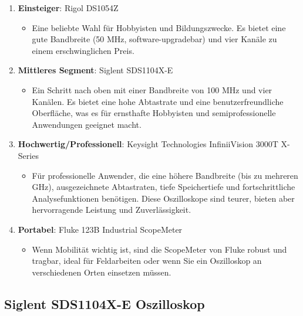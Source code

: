 \documentclass{vorlage-design-main}
\begin{document}
\begin{enumerate}
\def\labelenumi{\arabic{enumi}.}

\item
  \textbf{Einsteiger}: Rigol DS1054Z

  \begin{itemize}
  
  \item
    Eine beliebte Wahl für Hobbyisten und Bildungszwecke. Es bietet eine
    gute Bandbreite (50 MHz, software-upgradebar) und vier Kanäle zu
    einem erschwinglichen Preis.
  \end{itemize}
\item
  \textbf{Mittleres Segment}: Siglent SDS1104X-E

  \begin{itemize}
  
  \item
    Ein Schritt nach oben mit einer Bandbreite von 100 MHz und vier
    Kanälen. Es bietet eine hohe Abtastrate und eine benutzerfreundliche
    Oberfläche, was es für ernsthafte Hobbyisten und semiprofessionelle
    Anwendungen geeignet macht.
  \end{itemize}
\item
  \textbf{Hochwertig/Professionell}: Keysight Technologies InfiniiVision
  3000T X-Series

  \begin{itemize}
  
  \item
    Für professionelle Anwender, die eine höhere Bandbreite (bis zu
    mehreren GHz), ausgezeichnete Abtastraten, tiefe Speichertiefe und
    fortschrittliche Analysefunktionen benötigen. Diese Oszilloskope
    sind teurer, bieten aber hervorragende Leistung und Zuverlässigkeit.
  \end{itemize}
\item
  \textbf{Portabel}: Fluke 123B Industrial ScopeMeter

  \begin{itemize}
  
  \item
    Wenn Mobilität wichtig ist, sind die ScopeMeter von Fluke robust und
    tragbar, ideal für Feldarbeiten oder wenn Sie ein Oszilloskop an
    verschiedenen Orten einsetzen müssen.
  \end{itemize}
\end{enumerate}

\hypertarget{siglent-sds1104x-e-oszilloskop}{%
\subsection{Siglent SDS1104X-E
Oszilloskop}\label{siglent-sds1104x-e-oszilloskop}}
\end{document}
